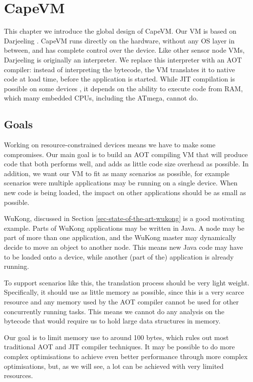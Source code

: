 \chapter{CapeVM}

This chapter we introduce the global design of CapeVM. Our VM is based on Darjeeling \cite{Brouwers:2009cj}. CapeVM runs directly on the hardware, without any OS layer in between, and has complete control over the device. Like other sensor node VMs, Darjeeling is originally an interpreter. We replace this interpreter with an AOT compiler: instead of interpreting the bytecode, the VM translates it to native code at load time, before the application is started. While JIT compilation is possible on some devices \cite{Ellul:2012thesis}, it depends on the ability to execute code from RAM, which many embedded CPUs, including the ATmega, cannot do.

\section{Goals}
\label{sec-CapeVM-goals}
Working on resource-constrained devices means we have to make some compromises. Our main goal is to build an AOT compiling VM that will produce code that both performs well, and adds as little code size overhead as possible. In addition, we want our VM to fit as many scenarios as possible, for example scenarios were multiple applications may be running on a single device. When new code is being loaded, the impact on other applications should be as small as possible.

WuKong, discussed in Section \ref{sec-state-of-the-art-wukong} is a good motivating example. Parts of WuKong applications may be written in Java. A node may be part of more than one application, and the WuKong master may dynamically decide to move an object to another node. This means new Java code may have to be loaded onto a device, while another (part of the) application is already running.

To support scenarios like this, the translation process should be very light weight. Specifically, it should use as little memory as possible, since this is a very scarce resource and any memory used by the AOT compiler cannot be used for other concurrently running tasks. This means we cannot do any analysis on the bytecode that would require us to hold large data structures in memory.

Our goal is to limit memory use to around 100 bytes, which rules out most traditional AOT and JIT compiler techniques. It may be possible to do more complex optimisations to achieve even better performance through more complex optimisations, but, as we will see, a lot can be achieved with very limited resources.

